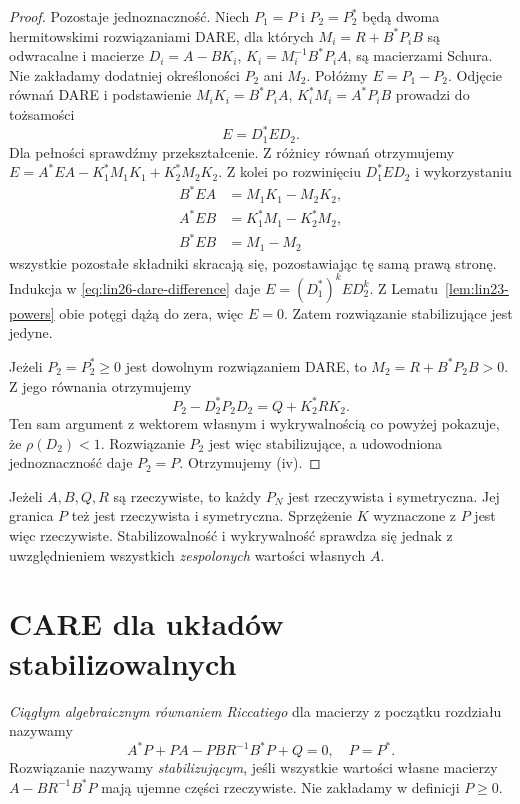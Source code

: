 \begin{proof}
Pozostaje jednoznaczność.
Niech \(P_1=P\) i
\(P_2=P_2^*\)
będą dwoma
hermitowskimi rozwiązaniami
DARE, dla których
\(M_i=R+B^*P_iB\)
są odwracalne
i macierze
\(D_i=A-BK_i\),
\(K_i=M_i^{-1}B^*P_iA\),
są macierzami Schura.
Nie zakładamy dodatniej
określoności \(P_2\)
ani \(M_2\).
Połóżmy \(E=P_1-P_2\).
Odjęcie równań DARE
i podstawienie
\(M_iK_i=B^*P_iA\),
\(K_i^*M_i=A^*P_iB\)
prowadzi do tożsamości
\[
 E=D_1^*ED_2.
 \tag{26.2}\label{eq:lin26-dare-difference}
\]
Dla pełności sprawdźmy
przekształcenie.
Z różnicy równań
otrzymujemy
\(E=A^*EA-K_1^*M_1K_1+
K_2^*M_2K_2\).
Z kolei po rozwinięciu
\(D_1^*ED_2\)
i wykorzystaniu
\[
 \begin{aligned}
 B^*EA&=M_1K_1-M_2K_2,\\
 A^*EB&=K_1^*M_1-K_2^*M_2,\\
 B^*EB&=M_1-M_2
 \end{aligned}
\]
wszystkie pozostałe
składniki skracają się,
pozostawiając tę samą
prawą stronę.
Indukcja w
\eqref{eq:lin26-dare-difference}
daje
\(E=(D_1^*)^kED_2^k\).
Z
Lematu~\ref{lem:lin23-powers}
obie potęgi dążą do zera,
więc \(E=0\).
Zatem rozwiązanie
stabilizujące jest jedyne.

Jeżeli \(P_2=P_2^*\ge0\)
jest dowolnym rozwiązaniem
DARE, to
\(M_2=R+B^*P_2B>0\).
Z jego równania otrzymujemy
\[
 P_2-D_2^*P_2D_2
 =Q+K_2^*RK_2.
\]
Ten sam argument z wektorem
własnym i wykrywalnością
co powyżej pokazuje,
że \(\rho(D_2)<1\).
Rozwiązanie \(P_2\)
jest więc stabilizujące,
a udowodniona jednoznaczność
daje \(P_2=P\).
Otrzymujemy (iv).
\end{proof}

\begin{uwaga}
\label{rem:lin26-dare-real}
Jeżeli \(A,B,Q,R\)
są rzeczywiste,
to każdy \(P_N\)
jest rzeczywista i symetryczna.
Jej granica \(P\)
też jest rzeczywista
i symetryczna.
Sprzężenie \(K\)
wyznaczone z \(P\)
jest więc rzeczywiste.
Stabilizowalność i wykrywalność
sprawdza się jednak
z uwzględnieniem
wszystkich \emph{zespolonych}
wartości własnych \(A\).
\end{uwaga}

\section{CARE dla układów stabilizowalnych}
\label{sec:lin26-care}

\begin{definicja}
\label{def:lin26-care}
\emph{Ciągłym algebraicznym
równaniem Riccatiego}
dla macierzy z początku
rozdziału nazywamy
\[
 A^*P+PA-PBR^{-1}B^*P+Q=0,\quad P=P^*.
\]
Rozwiązanie nazywamy
\emph{stabilizującym},
jeśli wszystkie wartości
własne macierzy
\(A-BR^{-1}B^*P\)
mają ujemne części rzeczywiste.
Nie zakładamy w definicji \(P\ge0\).
\end{definicja}

